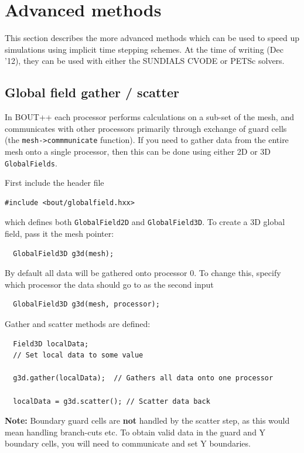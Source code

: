 \documentclass[12pt]{article}
\begin{document}
\section{Advanced methods}
\label{sec:precon}

This section describes the more advanced methods which can be used to speed up simulations using
implicit time stepping schemes. At the time of writing (Dec '12), they can be used with either the SUNDIALS CVODE
or PETSc solvers.

\subsection{Global field gather / scatter}

In BOUT++ each processor performs calculations on a sub-set of the mesh, and communicates with other
processors primarily through exchange of guard cells (the \lstinline!mesh->commmunicate! function).
If you need to gather data from the entire mesh onto a single processor, then this can be done
using either 2D or 3D \lstinline!GlobalFields!.

First include the header file
\begin{lstlisting}
#include <bout/globalfield.hxx>
\end{lstlisting}

which defines both \lstinline!GlobalField2D! and \lstinline!GlobalField3D!. To create a 3D global field,
pass it the mesh pointer:
\begin{lstlisting}
  GlobalField3D g3d(mesh);
\end{lstlisting}
By default all data will be gathered onto processor 0. To change this, specify which processor
the data should go to as the second input
\begin{lstlisting}
  GlobalField3D g3d(mesh, processor);
\end{lstlisting}
Gather and scatter methods are defined:
\begin{lstlisting}
  Field3D localData;
  // Set local data to some value

  g3d.gather(localData);  // Gathers all data onto one processor

  localData = g3d.scatter(); // Scatter data back
\end{lstlisting}
{\bf Note:} Boundary guard cells are {\bf not} handled by the scatter step, as this would mean handling
branch-cuts etc. To obtain valid data in the guard and Y boundary cells, you will need to communicate and
set Y boundaries.
\end{document}
